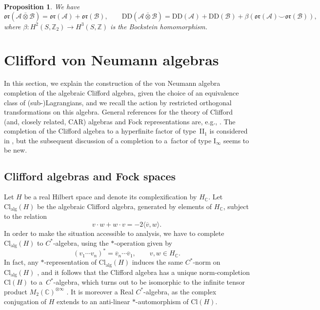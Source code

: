 \documentclass[11pt]{article}
\numberwithin{equation}{section}
\numberwithin{equation}{section}
\newtheorem{Proposition}[Theorem]{Proposition}
\newcommand{\Z}{\mathbb{Z}}
\newcommand{\C}{\mathbb{C}}
\newcommand{\Cl}{\mathrm{Cl}}
\newcommand{\DD}{\mathrm{DD}}
\newcommand{\oclass}{\mathfrak{or}}
\begin{document}
\begin{Proposition} \label{PropTensorProductDD}
We have
\begin{equation*}
\oclass(\mathcal{A} \bar{\otimes}\mathcal{B}) = \oclass(\mathcal{A}) + \oclass(\mathcal{B}), \qquad \DD(\mathcal{A} \bar{\otimes}  \mathcal{B}) = \DD(\mathcal{A}) + \DD(\mathcal{B}) + \beta(\oclass(\mathcal{A}) \smile \oclass(\mathcal{B})),
\end{equation*}
where $\beta\colon H^2(S, \Z_2) \to H^3(S, \Z)$ is the Bockstein homomorphism.
\end{Proposition}

\section{Clifford von Neumann algebras}

In this section, we explain the construction of the von Neumann algebra completion of the algebraic Clifford algebra, given the choice of an equivalence class of (sub-)Lagrangians, and we recall the action by restricted orthogonal transformations on this algebra.
General references for the theory of Clifford (and, closely related, CAR) algebras and Fock representations are, e.g., \cite{Araki1,PlymenRobinson,PressleySegal,PreviatoSpera,ShaleStinespring,SperaWurzbacherSpinors,WurzbacherFermionicSecondQuantization}.
The completion of the Clifford algebra to a hyperfinite factor of type~II$_1$ is considered in \cite[Section~1.3]{PlymenRobinson}, but the subsequent discussion of a completion to a~factor of type I$_\infty$ seems to be new.

\subsection{Clifford algebras and Fock spaces} \label{SectionCliffordAlgebras}

Let $H$ be a real Hilbert space and denote its complexification by $H_\C$.
Let $\Cl_{\mathrm{alg}}(H)$ be the algebraic Clifford algebra, generated by elements of $H_\C$, subject to the relation
\begin{equation*}
 v \cdot w + w \cdot v = - 2 \langle \overline{v}, w\rangle.
\end{equation*}
In order to make the situation accessible to analysis, we have to complete $\Cl_{\mathrm{alg}}(H)$ to $C^*$-algebra, using the $*$-operation given by
\begin{equation*}
 (v_1\cdots v_n)^* = \overline{v}_n \cdots \overline{v}_1, \qquad v, w \in H_\C.
\end{equation*}
In fact, any $*$-representation of $\Cl_{\mathrm{alg}}(H)$ induces the same $C^*$-norm on $\Cl_{\mathrm{alg}}(H)$ \cite[Proposition~1]{ShaleStinespring}, and it follows that the Clifford algebra has a unique norm-completion $\Cl(H)$ to a~$C^*$-algebra, which turns out to be isomorphic to the infinite tensor product $M_2(\C)^{\otimes \infty}$ \cite{Araki1}.
It is moreover a Real $C^*$-algebra, as the complex conjugation of $H$ extends to an anti-linear $*$-automorphism of $\Cl(H)$.
\end{document}
